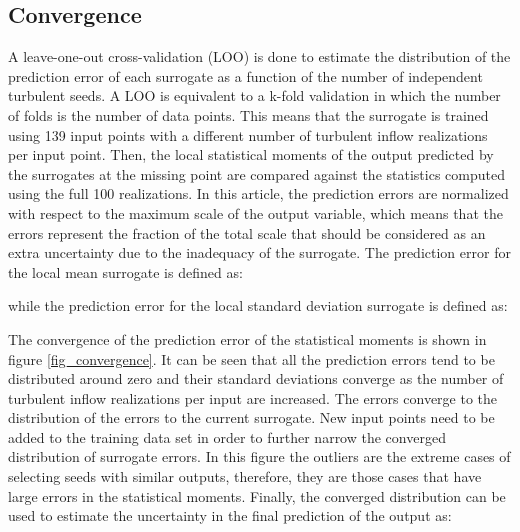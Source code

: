 \documentclass[preprint,12pt]{elsarticle}
\begin{document}
\subsection{Convergence}
\label{subsec_Convergence}

A leave-one-out cross-validation (LOO) is done to estimate the distribution of the prediction error of each surrogate as a function of the number of independent turbulent seeds. A LOO is equivalent to a k-fold validation in which the number of folds is the number of data points. This means that the surrogate is trained using 139 input points with a different number of turbulent inflow realizations per input point. Then, the local statistical moments of the output predicted by the surrogates at the missing point are compared against the statistics computed using the full 100 realizations. In this article, the prediction errors are normalized with respect to the maximum scale of the output variable, which means that the errors represent the fraction of the total scale that should be considered as an extra uncertainty due to the inadequacy of the surrogate. The prediction error for the local mean surrogate is defined as:


\noindent while the prediction error for the local standard deviation surrogate is defined as:




The convergence of the prediction error of the statistical moments is shown in figure \ref{fig_convergence}. It can be seen that all the prediction errors tend to be distributed around zero and their standard deviations converge as the number of turbulent inflow realizations per input are increased. The errors converge to the distribution of the errors to the current surrogate. New input points need to be added to the training data set in order to further narrow the converged distribution of surrogate errors. In this figure the outliers are the extreme cases of selecting seeds with similar outputs, therefore, they are those cases that have large errors in the statistical moments. Finally, the converged distribution can be used to estimate the uncertainty in the final prediction of the output as:
\end{document}

